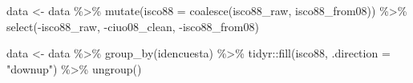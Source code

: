 \documentclass[
  spanish,
  a4paper,
  oneside]{scrbook}
\newenvironment{Shaded}{\begin{snugshade}}{\end{snugshade}}
\newcommand{\AttributeTok}[1]{\textcolor[rgb]{0.40,0.45,0.13}{#1}}
\newcommand{\FunctionTok}[1]{\textcolor[rgb]{0.28,0.35,0.67}{#1}}
\newcommand{\NormalTok}[1]{\textcolor[rgb]{0.00,0.23,0.31}{#1}}
\newcommand{\OtherTok}[1]{\textcolor[rgb]{0.00,0.23,0.31}{#1}}
\newcommand{\SpecialCharTok}[1]{\textcolor[rgb]{0.37,0.37,0.37}{#1}}
\newcommand{\StringTok}[1]{\textcolor[rgb]{0.13,0.47,0.30}{#1}}
\begin{document}
\begin{Shaded}
\begin{Highlighting}[]
\NormalTok{  data }\OtherTok{\textless{}{-}}\NormalTok{ data }\SpecialCharTok{\%\textgreater{}\%}
    \FunctionTok{mutate}\NormalTok{(}\AttributeTok{isco88 =} \FunctionTok{coalesce}\NormalTok{(isco88\_raw, isco88\_from08)) }\SpecialCharTok{\%\textgreater{}\%}
    \FunctionTok{select}\NormalTok{(}\SpecialCharTok{{-}}\NormalTok{isco88\_raw, }\SpecialCharTok{{-}}\NormalTok{ciuo08\_clean, }\SpecialCharTok{{-}}\NormalTok{isco88\_from08)}

\NormalTok{  data }\OtherTok{\textless{}{-}}\NormalTok{ data }\SpecialCharTok{\%\textgreater{}\%}
    \FunctionTok{group\_by}\NormalTok{(idencuesta) }\SpecialCharTok{\%\textgreater{}\%}
\NormalTok{    tidyr}\SpecialCharTok{::}\FunctionTok{fill}\NormalTok{(isco88, }\AttributeTok{.direction =} \StringTok{"downup"}\NormalTok{) }\SpecialCharTok{\%\textgreater{}\%}
    \FunctionTok{ungroup}\NormalTok{()}


\end{Highlighting}
\end{Shaded}
\end{document}
